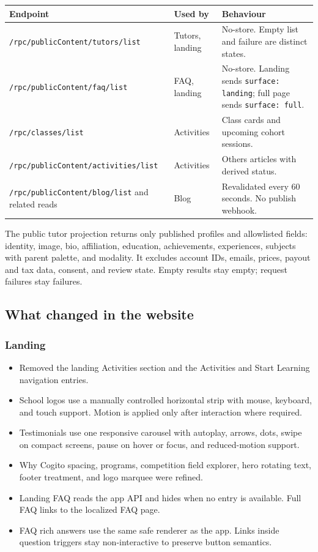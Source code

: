 \documentclass[11pt,a4paper]{article}
\newcommand{\code}[1]{\texttt{#1}}
\begin{document}
{\footnotesize
\begin{tabular}{@{}L{5.6cm}L{3.6cm}L{5.6cm}@{}}
\toprule
\textbf{Endpoint} & \textbf{Used by} & \textbf{Behaviour} \\
\midrule
\code{/rpc/publicContent/\allowbreak tutors/\allowbreak list} & Tutors, landing & No-store. Empty list and failure are distinct states. \\
\code{/rpc/publicContent/\allowbreak faq/\allowbreak list} & FAQ, landing & No-store. Landing sends \code{surface: landing}; full page sends \code{surface: full}. \\
\code{/rpc/classes/\allowbreak list} & Activities & Class cards and upcoming cohort sessions. \\
\code{/rpc/publicContent/\allowbreak activities/\allowbreak list} & Activities & Others articles with derived status. \\
\code{/rpc/publicContent/\allowbreak blog/\allowbreak list} and related reads & Blog & Revalidated every 60 seconds. No publish webhook. \\
\bottomrule
\end{tabular}
}

The public tutor projection returns only published profiles and allowlisted fields: identity, image, bio, affiliation, education, achievements, experiences, subjects with parent palette, and modality. It excludes account IDs, emails, prices, payout and tax data, consent, and review state. Empty results stay empty; request failures stay failures.

\subsection{What changed in the website}

\subsubsection{Landing}
\begin{itemize}
	\item Removed the landing Activities section and the Activities and Start Learning navigation entries.
	\item School logos use a manually controlled horizontal strip with mouse, keyboard, and touch support. Motion is applied only after interaction where required.
	\item Testimonials use one responsive carousel with autoplay, arrows, dots, swipe on compact screens, pause on hover or focus, and reduced-motion support.
	\item Why Cogito spacing, programs, competition field explorer, hero rotating text, footer treatment, and logo marquee were refined.
	\item Landing FAQ reads the app API and hides when no entry is available. Full FAQ links to the localized FAQ page.
	\item FAQ rich answers use the same safe renderer as the app. Links inside question triggers stay non-interactive to preserve button semantics.
\end{itemize}
\end{document}

